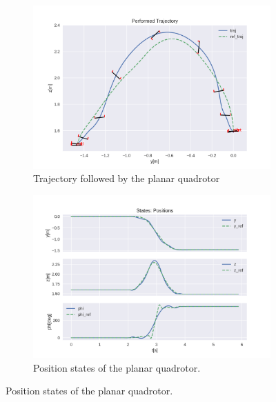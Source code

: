 \documentclass{thesisreport}
\begin{document}
\newpage

\begin{figure}[H]
	\begin{subfigure}{0.48\textwidth}
		\includegraphics[width=\linewidth]{Images/acados_simulations/flip_trajectory/planar_quadrotor/noiseless/sim.png}
		\caption{Trajectory followed by the planar quadrotor} \label{fig:flip_planar_sim_2d_noiseless}
	\end{subfigure}\hspace*{\fill}
	\begin{subfigure}{0.48\textwidth}
		\includegraphics[width=\linewidth]{Images/acados_simulations/flip_trajectory/planar_quadrotor/noiseless/posStates.png}
		\caption{Position states of the planar quadrotor.} \label{fig:flip_planar_sim_pose_noiseless}
	\end{subfigure}


\end{figure}
\end{document}
